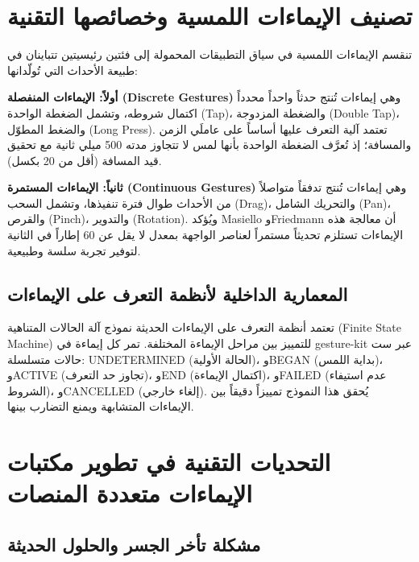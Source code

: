 \begin{Arabic}
\section{تصنيف الإيماءات اللمسية وخصائصها التقنية}

تنقسم الإيماءات اللمسية في سياق التطبيقات المحمولة إلى فئتين رئيسيتين تتباينان في طبيعة الأحداث التي تُولّدانها:

\textbf{أولاً: الإيماءات المنفصلة (\textenglish{Discrete Gestures})} وهي إيماءات تُنتج حدثاً واحداً محدداً اكتمال شروطه، وتشمل الضغطة الواحدة (\textenglish{Tap})، والضغطة المزدوجة (\textenglish{Double Tap})، والضغط المطوّل (\textenglish{Long Press}). تعتمد آلية التعرف عليها أساساً على عاملَي الزمن والمسافة؛ إذ تُعرَّف الضغطة الواحدة بأنها لمس لا تتجاوز مدته 500 ميلي ثانية مع تحقيق قيد المسافة (أقل من 20 بكسل).

\textbf{ثانياً: الإيماءات المستمرة (\textenglish{Continuous Gestures})} وهي إيماءات تُنتج تدفقاً متواصلاً من الأحداث طوال فترة تنفيذها، وتشمل السحب (\textenglish{Drag})، والتحريك الشامل (\textenglish{Pan})، والقرص (\textenglish{Pinch})، والتدوير (\textenglish{Rotation}). ويُؤكد \textenglish{Masiello} و\textenglish{Friedmann} \cite{masiello2017} أن معالجة هذه الإيماءات تستلزم تحديثاً مستمراً لعناصر الواجهة بمعدل لا يقل عن 60 إطاراً في الثانية لتوفير تجربة سلسة وطبيعية.

\subsection{المعمارية الداخلية لأنظمة التعرف على الإيماءات}

تعتمد أنظمة التعرف على الإيماءات الحديثة نموذج آلة الحالات المتناهية (\textenglish{Finite State Machine}) للتمييز بين مراحل الإيماءة المختلفة. تمر كل إيماءة في \textenglish{gesture-kit} عبر ست حالات متسلسلة: \textenglish{UNDETERMINED} (الحالة الأولية)، و\textenglish{BEGAN} (بداية اللمس)، و\textenglish{ACTIVE} (تجاوز حد التعرف)، و\textenglish{END} (اكتمال الإيماءة)، و\textenglish{FAILED} (عدم استيفاء الشروط)، و\textenglish{CANCELLED} (إلغاء خارجي). يُحقق هذا النموذج تمييزاً دقيقاً بين الإيماءات المتشابهة ويمنع التضارب بينها.

\section{التحديات التقنية في تطوير مكتبات الإيماءات متعددة المنصات}

\subsection{مشكلة تأخر الجسر والحلول الحديثة}


\end{Arabic}

